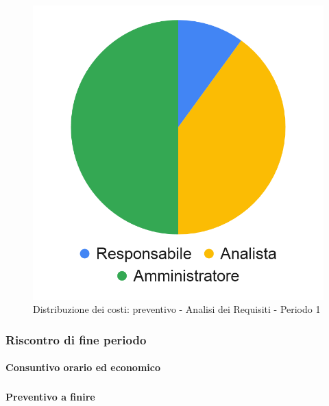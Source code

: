 \hspace{-1cm}
\begin{minipage}{.50\textwidth}
\smallPreventivoTable{
	
}
\end{minipage}
\hspace{1cm}
\begin{minipage}{.40\textwidth}
\begin{figure}[H]
	\includegraphics[scale=0.21]{res/images/charts/preventivo_priori/Grafico4-1.png}
	\caption{Distribuzione dei costi: preventivo - Analisi dei Requisiti - Periodo 1}
\end{figure}\end{minipage} 




\subsubsection{Riscontro di fine periodo}


\paragraph{Consuntivo orario ed economico}
\subparagraph*{}


\paragraph{Preventivo a finire}
\subparagraph*{}


